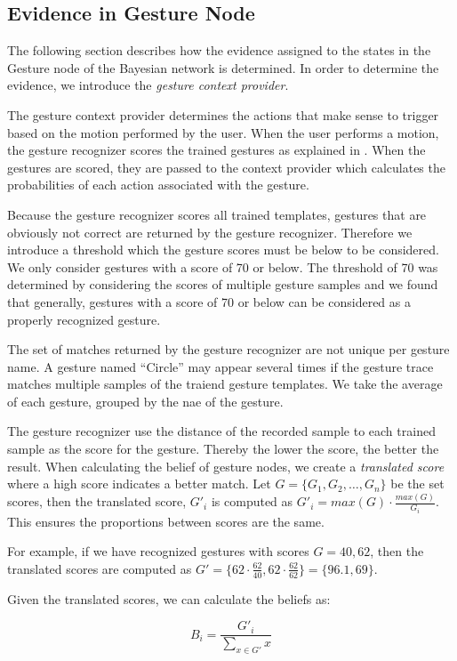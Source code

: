 \subsection{Evidence in Gesture Node}
\label{sec:design:bayesian-network:gesture-node-evidence}

The following section describes how the evidence assigned to the states in the Gesture node of the Bayesian network is determined. In order to determine the evidence, we introduce the \emph{gesture context provider}.

The gesture context provider determines the actions that make sense to trigger based on the motion performed by the user. When the user performs a motion, the gesture recognizer scores the trained gestures as explained in . When the gestures are scored, they are passed to the context provider which calculates the probabilities of each action associated with the gesture. 

Because the gesture recognizer scores all trained templates, gestures that are obviously not correct are returned by the gesture recognizer. Therefore we introduce a threshold which the gesture scores must be below to be considered. We only consider gestures with a score of 70 or below. The threshold of 70 was determined by considering the scores of multiple gesture samples and we found that generally, gestures with a score of 70 or below can be considered as a properly recognized gesture.

The set of matches returned by the gesture recognizer are not unique per gesture name. A gesture named ``Circle'' may appear several times if the gesture trace matches multiple samples of the traiend gesture templates. We take the average of each gesture, grouped by the nae of the gesture.

The gesture recognizer use the distance of the recorded sample to each trained sample as the score for the gesture. Thereby the lower the score, the better the result. When calculating the belief of gesture nodes, we create a \emph{translated score} where a high score indicates a better match. Let $G = \{G_1, G_2, \ldots, G_n\}$ be the set scores, then the translated score, $G'_i$ is computed as $G'_i = max(G) \cdot \frac{max(G)}{G_i}$. This ensures the proportions between scores are the same.

For example, if we have recognized gestures with scores $G = {40, 62}$, then the translated scores are computed as $G' = \{ 62 \cdot \frac{62}{40}, 62 \cdot \frac{62}{62} \} = \{ 96.1, 69 \}$.

Given the translated scores, we can calculate the beliefs as:

\begin{equation*}
B_i = \frac{{G'}_{i}}{\sum\limits_{x \in G'} x}
\end{equation*}

